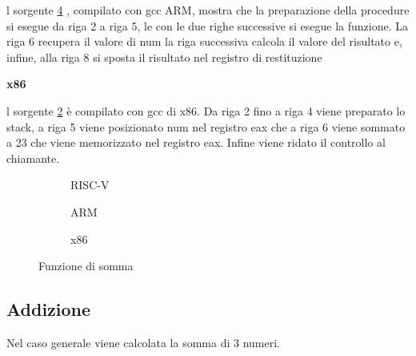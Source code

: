 \documentclass[12pt,a4paper]{report}
\begin{document}
l sorgente  \ref{Code:Addx86} , compilato con gcc ARM, mostra che la preparazione della procedure si esegue da riga 2 a riga 5, le con le due righe successive si esegue la funzione. La riga 6 recupera il valore di num la riga successiva calcola il valore del risultato e, infine, alla riga 8 si sposta il risultato nel registro di restituzione


\vspace{0.3 cm}
\textbf{x86}

l sorgente  \ref{Code:AddARM} è compilato con gcc di x86.  Da riga 2 fino a riga 4 viene preparato lo stack, a riga 5 viene posizionato num nel registro eax che a riga 6 viene sommato a 23 che viene memorizzato nel registro eax. Infine viene ridato il controllo al chiamante.

\vspace{0.3 cm}

\begin{figure}[h!]
     
     \begin{subfigure}{0.3\textwidth}
  
        
\label{Code:AddRISCV}
\caption{RISC-V}
     \end{subfigure}
     \hfill
     \begin{subfigure}{0.3\textwidth}
         
          
\caption{ARM}
\label{Code:AddARM}
     \end{subfigure}
     \hfill
     \begin{subfigure}{0.3\textwidth}
         
          
	 \caption{x86}
	\label{Code:Addx86}
     \end{subfigure}
    
        \caption{Funzione di somma}
        
\end{figure}

\subsection{Addizione}
Nel caso generale viene calcolata la somma di 3 numeri.

\end{document}
